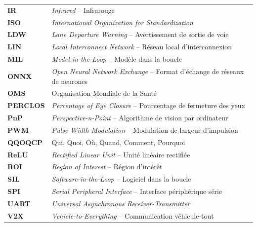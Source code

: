 \begin{longtable}{@{} >{\bfseries}l @{\hspace{2cm}} l @{}}
IR      & \textit{Infrared} -- Infrarouge \\[0.2cm]
ISO     & \textit{International Organization for Standardization} \\[0.2cm]
LDW     & \textit{Lane Departure Warning} -- Avertissement de sortie de voie \\[0.2cm]
LIN     & \textit{Local Interconnect Network} -- Réseau local d'interconnexion \\[0.2cm]
MIL     & \textit{Model-in-the-Loop} -- Modèle dans la boucle \\[0.2cm]
ONNX    & \textit{Open Neural Network Exchange} -- Format d'échange de réseaux de neurones \\[0.2cm]
OMS     & Organisation Mondiale de la Santé \\[0.2cm]
PERCLOS & \textit{Percentage of Eye Closure} -- Pourcentage de fermeture des yeux \\[0.2cm]
PnP     & \textit{Perspective-n-Point} -- Algorithme de vision par ordinateur \\[0.2cm]
PWM     & \textit{Pulse Width Modulation} -- Modulation de largeur d'impulsion \\[0.2cm]
QQOQCP  & Qui, Quoi, Où, Quand, Comment, Pourquoi \\[0.2cm]
ReLU    & \textit{Rectified Linear Unit} -- Unité linéaire rectifiée \\[0.2cm]
ROI     & \textit{Region of Interest} -- Région d'intérêt \\[0.2cm]
SIL     & \textit{Software-in-the-Loop} -- Logiciel dans la boucle \\[0.2cm]
SPI     & \textit{Serial Peripheral Interface} -- Interface périphérique série \\[0.2cm]
UART    & \textit{Universal Asynchronous Receiver-Transmitter} \\[0.2cm]
V2X     & \textit{Vehicle-to-Everything} -- Communication véhicule-tout \\[0.2cm]
\end{longtable}
